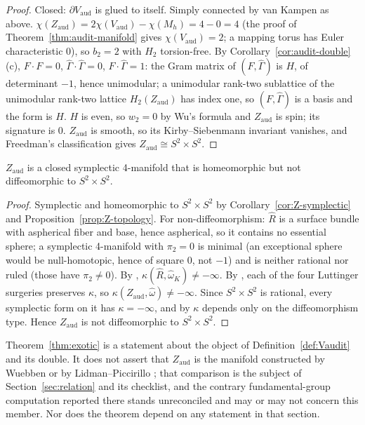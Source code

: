 \begin{proof}
Closed: $\partial V_{\mathrm{aud}}$ is glued to itself.  Simply connected
by van Kampen as above.  $\chi(Z_{\mathrm{aud}})=2\chi(V_{\mathrm{aud}})-\chi(M_h)=4-0=4$
(the proof of Theorem~\ref{thm:audit-manifold} gives
$\chi(V_{\mathrm{aud}})=2$; a mapping torus has Euler characteristic $0$),
so $b_2=2$ with $H_2$ torsion-free.  By
Corollary~\ref{cor:audit-double}(c), $F\cdot F=0$, $\hat\Gamma\cdot\hat\Gamma=0$,
$F\cdot\hat\Gamma=1$: the Gram matrix of $(F,\hat\Gamma)$ is $H$, of
determinant $-1$, hence unimodular; a unimodular rank-two sublattice of the
unimodular rank-two lattice $H_2(Z_{\mathrm{aud}})$ has index one, so
$(F,\hat\Gamma)$ is a basis and the form is $H$.  $H$ is even, so
$w_2=0$ by Wu's formula and $Z_{\mathrm{aud}}$ is spin; its signature is
$0$.  $Z_{\mathrm{aud}}$ is smooth, so its Kirby--Siebenmann invariant
vanishes, and Freedman's classification gives
$Z_{\mathrm{aud}}\cong S^2\times S^2$.
\end{proof}

\begin{theorem}\label{thm:exotic}
$Z_{\mathrm{aud}}$ is a closed symplectic 4-manifold that is homeomorphic
but not diffeomorphic to $S^2\times S^2$.
\end{theorem}

\begin{proof}
Symplectic and homeomorphic to $S^2\times S^2$ by
Corollary~\ref{cor:Z-symplectic} and Proposition~\ref{prop:Z-topology}.
For non-diffeomorphism: $\hat R$ is a surface bundle with aspherical fiber
and base, hence aspherical, so it contains no essential sphere; a
symplectic 4-manifold with $\pi_2=0$ is minimal (an exceptional sphere
would be null-homotopic, hence of square $0$, not $-1$) and is neither
rational nor ruled (those have $\pi_2\ne0$).  By \cite{Li},
$\kappa(\hat R,\hat\omega_K)\ne-\infty$.  By \cite{HoLi}, each of the four
Luttinger surgeries preserves $\kappa$, so $\kappa(Z_{\mathrm{aud}},\hat\omega)\ne-\infty$.
Since $S^2\times S^2$ is rational, every symplectic form on it has
$\kappa=-\infty$, and by \cite{Li} $\kappa$ depends only on the
diffeomorphism type.  Hence $Z_{\mathrm{aud}}$ is not diffeomorphic to
$S^2\times S^2$.
\end{proof}

\begin{remark}
Theorem~\ref{thm:exotic} is a statement about the object of
Definition~\ref{def:Vaudit} and its double.  It does not assert that
$Z_{\mathrm{aud}}$ is the manifold constructed by Wuebben \cite{Wuebben} or
by Lidman--Piccirillo \cite{LidmanPiccirillo}; that comparison is the
subject of Section~\ref{sec:relation} and its checklist, and the contrary
fundamental-group computation reported there stands unreconciled and may
or may not concern this member.  Nor does the theorem depend on any
statement in that section.
\end{remark}
